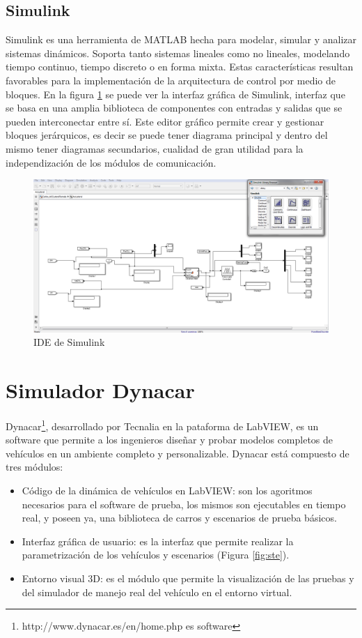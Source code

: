 \subsection{Simulink}
Simulink es una herramienta de MATLAB hecha para modelar, simular y analizar sistemas dinámicos. Soporta tanto sistemas lineales como no lineales, modelando tiempo continuo, tiempo discreto o en forma mixta. Estas características resultan favorables para la implementación de la arquitectura de control por medio de bloques. En la figura \ref{fig:sim} se puede ver la interfaz gráfica de Simulink, interfaz que se basa en una amplia biblioteca de componentes con entradas y salidas que se pueden interconectar entre sí. Este editor gráfico permite crear y gestionar bloques jerárquicos, es decir se puede tener diagrama principal y dentro del mismo tener diagramas secundarios, cualidad de gran utilidad para la independización de los módulos de comunicación.\\ 

\begin{figure}[!h]
	\centering
		\includegraphics[scale=0.3]{Imagenes/sim}
		\caption{IDE de Simulink}
		\label{fig:sim}
\end{figure}	
\section{Simulador Dynacar}
Dynacar\footnote{http://www.dynacar.es/en/home.php es software}, desarrollado por Tecnalia en la pataforma de LabVIEW, es un software que permite a los ingenieros diseñar y probar modelos completos de vehículos en un ambiente completo y personalizable. Dynacar está compuesto de tres módulos:
\begin{itemize}
	\item Código de la dinámica de vehículos en LabVIEW: son los agoritmos necesarios para el software de prueba, los mismos son ejecutables en tiempo real, y poseen ya, una biblioteca de carros y escenarios de prueba básicos.
	\item Interfaz gráfica de usuario: es la interfaz que permite realizar la parametrización de los vehículos y escenarios (Figura \ref{fig:ste}).
	\item Entorno visual 3D: es el módulo que permite la visualización de las pruebas y del simulador de manejo real del vehículo en el entorno virtual.
\end{itemize}

